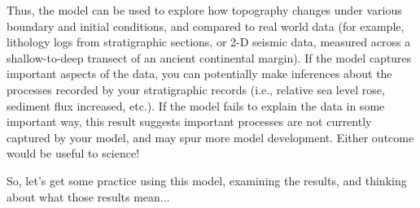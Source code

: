 \noindent Thus, the model can be used to explore how topography changes under various boundary and initial conditions, and compared to real world data (for example, lithology logs from stratigraphic sections, or 2-D seismic data, measured across a shallow-to-deep transect of an ancient continental margin). If the model captures important aspects of the data, you can potentially make inferences about the processes recorded by your stratigraphic records (i.e., relative sea level rose, sediment flux increased, etc.). If the model fails to explain the data in some important way, this result suggests important processes are not currently captured by your model, and may spur more model development. Either outcome would be useful to science!\\

\vspace{1em}

\noindent So, let's get some practice using this model, examining the results, and thinking about what those results mean...
